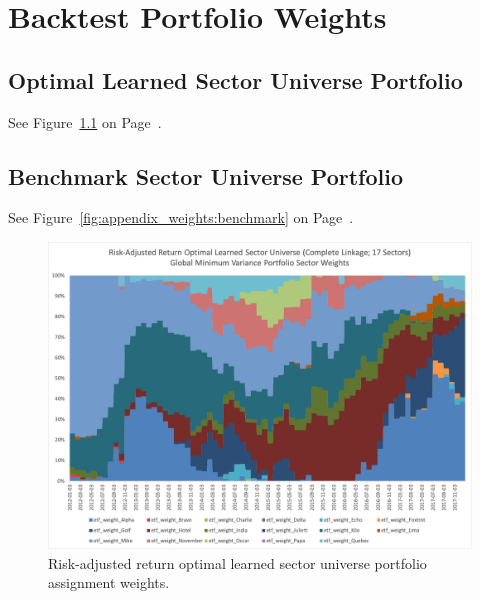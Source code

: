 \documentclass[../main.tex]{subfiles}
\begin{document}
\chapter{Backtest Portfolio Weights} \label{appendix:portfolio_weights}

\section*{Optimal Learned Sector Universe Portfolio}

See Figure~\ref{fig:appendix_weights:sharpe_optimal} on Page~\pageref{fig:appendix_weights:sharpe_optimal}.


\section*{Benchmark Sector Universe Portfolio}

See Figure~\ref{fig:appendix_weights:benchmark} on Page~\pageref{fig:appendix_weights:benchmark}.

\newpage
\begin{figure}
    \centering
    \includegraphics[width=\linewidth]{images/complete_17_sector_assignments.png}
    \caption{Risk-adjusted return optimal learned sector universe portfolio assignment weights.}
    \label{fig:appendix_weights:sharpe_optimal}
\end{figure}
\end{document}
